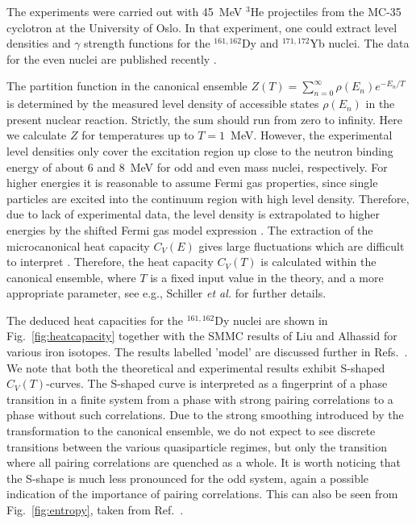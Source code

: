 \documentclass{elsart}
\begin{document}
The experiments were carried out with 45~MeV $^3$He projectiles from the MC-35 
cyclotron at the University of Oslo. In that experiment, one could
extract level densities and $\gamma$
strength functions for the $^{161,162}$Dy and $^{171,172}$Yb nuclei. The data 
for the even nuclei are published recently \cite{andreas2000}.

The partition function in the canonical ensemble 
$Z(T)=\sum_{n=0}^\infty\rho(E_n)e^{-E_n/T} $
is determined by the measured level density of accessible states $\rho(E_n)$ in
the present nuclear reaction. Strictly, the sum should run from zero to 
infinity. Here  we calculate $Z$ for temperatures up to $T=1$~MeV. 
However, the experimental level
densities only cover the excitation region up 
close to the neutron binding energy of about 6 and 8~MeV for odd and even mass 
nuclei, respectively. For higher energies it is reasonable to assume Fermi gas 
properties, since single particles are excited into the continuum region with 
high level density. Therefore, due to lack of experimental data, the level 
density is extrapolated to higher energies by the shifted Fermi gas model 
expression \cite{GC65}. 
The extraction of the microcanonical heat capacity $C_V(E)$ gives large 
fluctuations which are difficult to interpret \cite{andreas2000}. Therefore, the heat 
capacity $C_V(T)$ is calculated within the canonical ensemble, where $T$ is a 
fixed input value in the theory, and a more appropriate parameter,
see e.g., Schiller {\em et al.} \cite{andreas2000} for further details.

The deduced heat capacities for the $^{161,162}$Dy nuclei 
are shown in Fig.~\ref{fig:heatcapacity} together with the SMMC
results of Liu and Alhassid \cite{Al99} for various iron isotopes.
The results labelled 'model' are discussed further in Refs.\ 
\cite{dh2003,andreas2000}. We note that both the theoretical and 
experimental results exhibit 
S-shaped $C_V(T)$-curves.
The S-shaped curve is interpreted as a 
fingerprint of a phase transition in a finite system from a phase with strong 
pairing correlations to a phase without such correlations. Due to the strong 
smoothing introduced by the transformation to the canonical ensemble, we do not
expect to see discrete transitions between the various quasiparticle regimes, 
but only the transition where all pairing correlations are quenched as a whole.
It is worth noticing that the S-shape is much less 
pronounced for the odd system,
again a possible indication of the importance of pairing correlations. 
This can also be seen from Fig.\ \ref{fig:entropy}, taken from Ref.\
\cite{andreas2000}.
\end{document}
